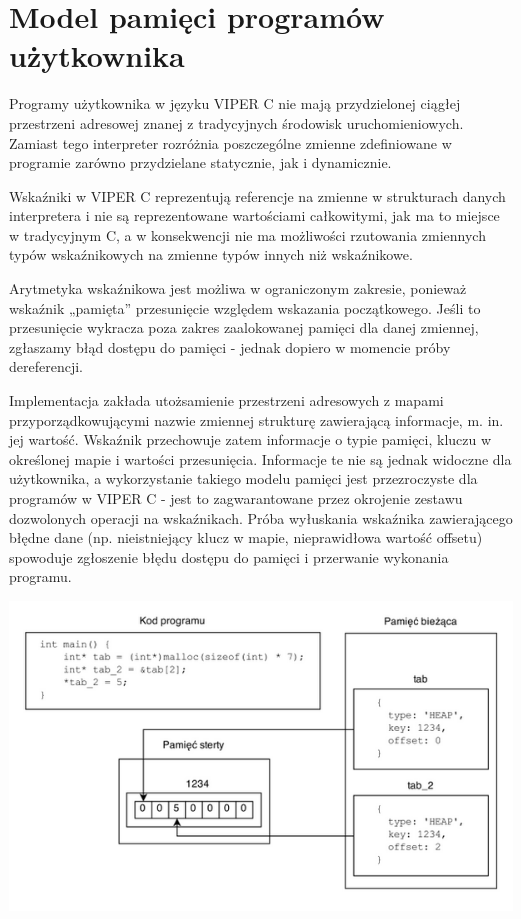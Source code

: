 \documentclass[a4paper,twoside,openright,11pt]{report}
\begin{document}
  \section {Model pamięci programów użytkownika}
  \par Programy użytkownika w języku VIPER C nie mają przydzielonej ciągłej przestrzeni adresowej znanej z tradycyjnych środowisk uruchomieniowych. Zamiast tego interpreter rozróżnia poszczególne zmienne zdefiniowane w programie zarówno przydzielane statycznie, jak i dynamicznie. 
  \par Wskaźniki w VIPER C reprezentują referencje na zmienne w strukturach danych interpretera i nie są reprezentowane wartościami całkowitymi, jak ma to miejsce w tradycyjnym C, a w konsekwencji nie ma możliwości rzutowania zmiennych typów wskaźnikowych na zmienne typów innych niż wskaźnikowe. 
  \par Arytmetyka wskaźnikowa jest możliwa w ograniczonym zakresie, ponieważ wskaźnik „pamięta” przesunięcie względem wskazania początkowego. Jeśli to przesunięcie wykracza poza zakres zaalokowanej pamięci dla danej zmiennej, zgłaszamy błąd dostępu do pamięci - jednak dopiero w momencie próby dereferencji. 
  \par Implementacja zakłada utożsamienie przestrzeni adresowych z mapami przyporządkowującymi nazwie zmiennej strukturę zawierającą informacje, m. in. jej wartość. Wskaźnik przechowuje zatem informacje o typie pamięci, kluczu w określonej mapie i wartości przesunięcia. Informacje te nie są jednak widoczne dla użytkownika, a wykorzystanie takiego modelu pamięci jest przezroczyste dla programów w VIPER C - jest to zagwarantowane przez okrojenie zestawu dozwolonych operacji na wskaźnikach. Próba wyłuskania wskaźnika zawierającego błędne dane (np. nieistniejący klucz w mapie, nieprawidłowa wartość offsetu) spowoduje zgłoszenie błędu dostępu do pamięci i przerwanie wykonania programu.

\begin{center}
  \includegraphics[width=\textwidth]{pam}
\end{center}
\end{document}
